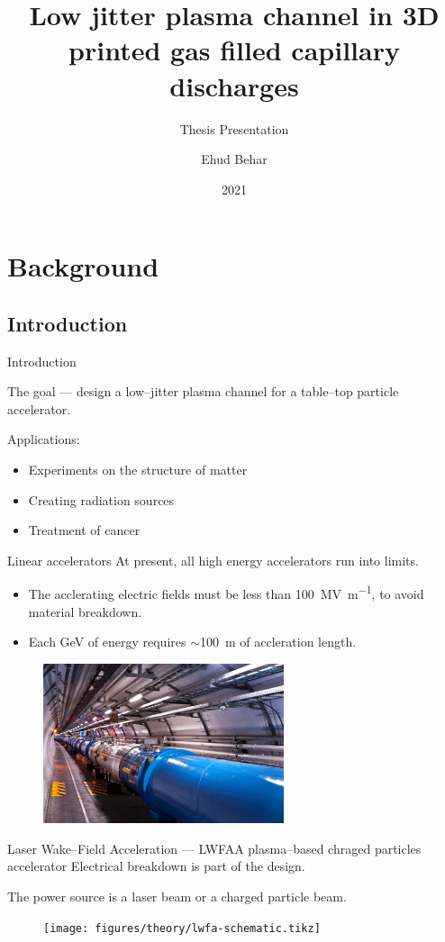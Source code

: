\documentclass[dvipsnames]{beamer}
\title[]{Low jitter plasma channel in 3D printed gas filled capillary discharges}
\subtitle{Thesis Presentation}
\author[]{Ehud Behar}
\institute{Hebrew University of Jerusalem}
\date{2021}
\begin{document}
\frame{\titlepage}

\section{Background}
\subsection{Introduction}
  \begin{frame}{Introduction}
  \begin{center}
    The goal --- design a low--jitter plasma channel for a table--top particle accelerator.
  \end{center}
    Applications:
    \begin{itemize}
        \item[\textbullet] Experiments on the structure of matter
        \item[\textbullet] Creating radiation sources
        \item[\textbullet] Treatment of cancer
    \end{itemize}
  \end{frame}

\begin{frame}{Linear accelerators}
At present, all high energy accelerators run into limits.
\begin{itemize}
\item[\textbullet] The acclerating electric fields must be less than \SI[per-mode=symbol]{100}{\mega \V \per\meter}, to avoid material breakdown.
\item[\textbullet] Each \si{\giga \eV} of energy requires $\sim$\SI{100}{\meter} of accleration length.
\end{itemize}
\begin{figure}
\includegraphics[width=200pt]{figures/theory/lhc_cern_compressed.jpg}
\end{figure}
\end{frame}
\begin{frame}{Laser Wake--Field Acceleration --- LWFA}{A plasma--based chraged particles accelerator}
Electrical breakdown is part of the design.

The power source is a laser beam or a charged particle beam.
\begin{figure}
\texttt{[image: figures/theory/lwfa-schematic.tikz]}
\end{figure}
\end{frame}
\end{document}
